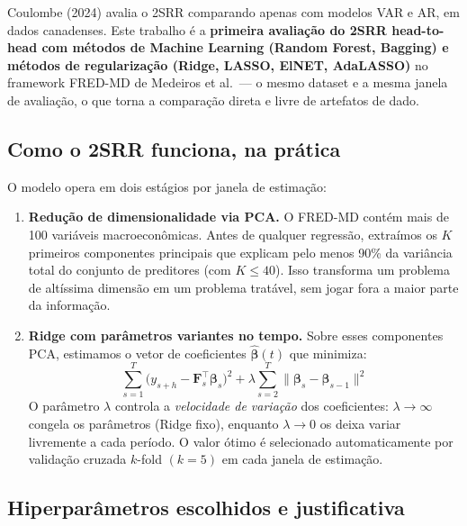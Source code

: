 \documentclass[12pt, a4paper]{article}
\begin{document}
\begin{destaque}
  Coulombe (2024) avalia o 2SRR comparando apenas com modelos
  VAR e AR, em dados canadenses. Este trabalho é a \textbf{primeira
  avaliação do 2SRR head-to-head com métodos de Machine Learning
  (Random Forest, Bagging) e métodos de regularização (Ridge,
  LASSO, ElNET, AdaLASSO)} no framework FRED-MD de Medeiros et
  al.\ --- o mesmo dataset e a mesma janela de avaliação, o que
  torna a comparação direta e livre de artefatos de dado.
\end{destaque}

\subsection{Como o 2SRR funciona, na prática}

O modelo opera em dois estágios por janela de estimação:

\begin{enumerate}[leftmargin=*, label=\textbf{Passo \arabic*.}]
  \item \textbf{Redução de dimensionalidade via PCA.}
    O FRED-MD contém mais de 100 variáveis macroeconômicas.
    Antes de qualquer regressão, extraímos os $K$ primeiros
    componentes principais que explicam pelo menos 90\% da
    variância total do conjunto de preditores (com $K \leq 40$).
    Isso transforma um problema de altíssima dimensão em um
    problema tratável, sem jogar fora a maior parte da informação.

  \item \textbf{Ridge com parâmetros variantes no tempo.}
    Sobre esses componentes PCA, estimamos o vetor de coeficientes
    $\hat{\boldsymbol{\beta}}(t)$ que minimiza:
    \[
      \sum_{s=1}^{T}
      \bigl(y_{s+h} - \mathbf{F}_s^\top \boldsymbol{\beta}_s\bigr)^2
      + \lambda \sum_{s=2}^{T}
      \|\boldsymbol{\beta}_s - \boldsymbol{\beta}_{s-1}\|^2
    \]
    O parâmetro $\lambda$ controla a \emph{velocidade de variação}
    dos coeficientes: $\lambda \to \infty$ congela os parâmetros
    (Ridge fixo), enquanto $\lambda \to 0$ os deixa variar
    livremente a cada período. O valor ótimo é selecionado
    automaticamente por validação cruzada $k$-fold $(k=5)$
    em cada janela de estimação.
\end{enumerate}

\subsection{Hiperparâmetros escolhidos e justificativa}
\end{document}
